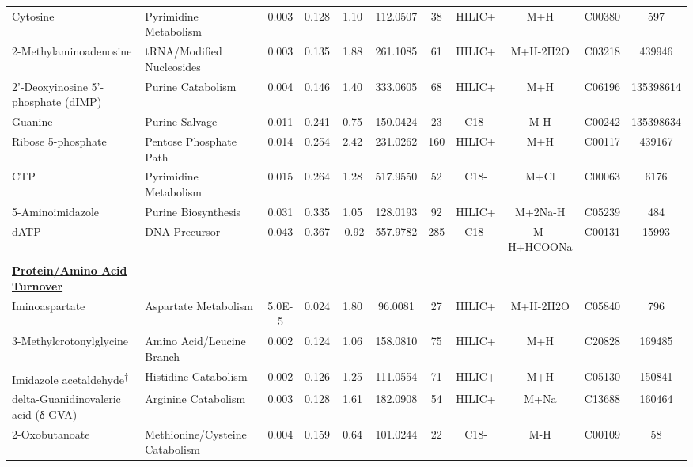\begin{longtable}[t]{llccccccccc}
\hspace*{0.3cm}Cytosine & Pyrimidine Metabolism & 0.003 & 0.128 & 1.10 & 112.0507 & 38 & HILIC+ & M+H & C00380 & 597\\
\hspace*{0.3cm}2-Methylaminoadenosine & tRNA/Modified Nucleosides & 0.003 & 0.135 & 1.88 & 261.1085 & 61 & HILIC+ & M+H-2H2O & C03218 & 439946\\
\hspace*{0.3cm}2'-Deoxyinosine 5'-phosphate (dIMP) & Purine Catabolism & 0.004 & 0.146 & 1.40 & 333.0605 & 68 & HILIC+ & M+H & C06196 & 135398614\\
\hspace*{0.3cm}Guanine & Purine Salvage & 0.011 & 0.241 & 0.75 & 150.0424 & 23 & C18- & M-H & C00242 & 135398634\\
\hspace*{0.3cm}Ribose 5-phosphate & Pentose Phosphate Path & 0.014 & 0.254 & 2.42 & 231.0262 & 160 & HILIC+ & M+H & C00117 & 439167\\

\hspace*{0.3cm}CTP & Pyrimidine Metabolism & 0.015 & 0.264 & 1.28 & 517.9550 & 52 & C18- & M+Cl & C00063 & 6176\\
\hspace*{0.3cm}5-Aminoimidazole & Purine Biosynthesis & 0.031 & 0.335 & 1.05 & 128.0193 & 92 & HILIC+ & M+2Na-H & C05239 & 484\\
\hspace*{0.3cm}dATP & DNA Precursor & 0.043 & 0.367 & -0.92 & 557.9782 & 285 & C18- & M-H+HCOONa & C00131 & 15993\\
 &  &  &  &  &  &  &  &  &  & \\
\fontsize{9pt}{10.8pt}\selectfont\textbf{\underline{Protein/Amino Acid Turnover}} &  &  &  &  &  &  &  &  &  & \\

\hspace*{0.3cm}Iminoaspartate & Aspartate Metabolism & 5.0E-5 & 0.024 & 1.80 & 96.0081 & 27 & HILIC+ & M+H-2H2O & C05840 & 796\\
\hspace*{0.3cm}3-Methylcrotonylglycine & Amino Acid/Leucine Branch & 0.002 & 0.124 & 1.06 & 158.0810 & 75 & HILIC+ & M+H & C20828 & 169485\\
\hspace*{0.3cm}Imidazole acetaldehyde\textsuperscript{†} & Histidine Catabolism & 0.002 & 0.126 & 1.25 & 111.0554 & 71 & HILIC+ & M+H & C05130 & 150841\\
\hspace*{0.3cm}delta-Guanidinovaleric acid (δ-GVA) & Arginine Catabolism & 0.003 & 0.128 & 1.61 & 182.0908 & 54 & HILIC+ & M+Na & C13688 & 160464\\
\hspace*{0.3cm}2-Oxobutanoate & Methionine/Cysteine Catabolism & 0.004 & 0.159 & 0.64 & 101.0244 & 22 & C18- & M-H & C00109 & 58\\


\end{longtable}

